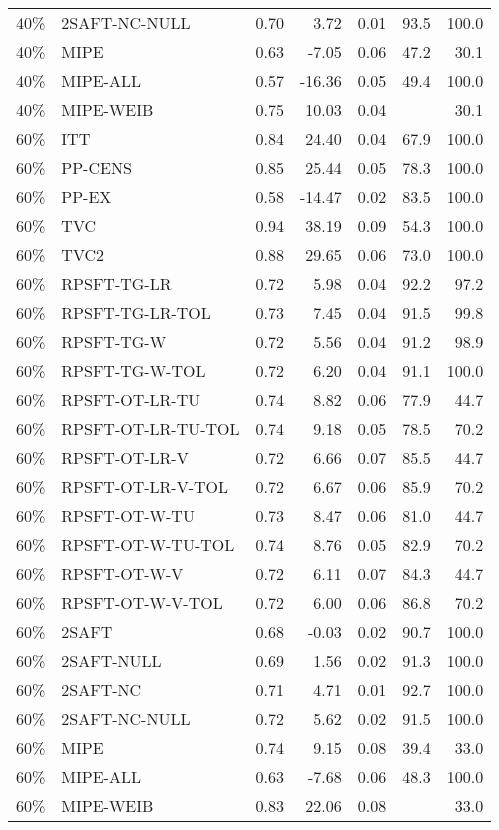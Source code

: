 \begin{table}[ht]
{\begin{tabular}{llrrrrr}
  40\% & 2SAFT-NC-NULL & 0.70 & 3.72 & 0.01 & 93.5 & 100.0 \\ 
  40\% & MIPE & 0.63 & -7.05 & 0.06 & 47.2 & 30.1 \\ 
  40\% & MIPE-ALL & 0.57 & -16.36 & 0.05 & 49.4 & 100.0 \\ 
  40\% & MIPE-WEIB & 0.75 & 10.03 & 0.04 &  & 30.1 \\ 
   \hline
60\% & ITT & 0.84 & 24.40 & 0.04 & 67.9 & 100.0 \\ 
  60\% & PP-CENS & 0.85 & 25.44 & 0.05 & 78.3 & 100.0 \\ 
  60\% & PP-EX & 0.58 & -14.47 & 0.02 & 83.5 & 100.0 \\ 
  60\% & TVC & 0.94 & 38.19 & 0.09 & 54.3 & 100.0 \\ 
  60\% & TVC2 & 0.88 & 29.65 & 0.06 & 73.0 & 100.0 \\ 
   \hline
60\% & RPSFT-TG-LR & 0.72 & 5.98 & 0.04 & 92.2 & 97.2 \\ 
  60\% & RPSFT-TG-LR-TOL & 0.73 & 7.45 & 0.04 & 91.5 & 99.8 \\ 
  60\% & RPSFT-TG-W & 0.72 & 5.56 & 0.04 & 91.2 & 98.9 \\ 
  60\% & RPSFT-TG-W-TOL & 0.72 & 6.20 & 0.04 & 91.1 & 100.0 \\ 
  60\% & RPSFT-OT-LR-TU & 0.74 & 8.82 & 0.06 & 77.9 & 44.7 \\ 
  60\% & RPSFT-OT-LR-TU-TOL & 0.74 & 9.18 & 0.05 & 78.5 & 70.2 \\ 
  60\% & RPSFT-OT-LR-V & 0.72 & 6.66 & 0.07 & 85.5 & 44.7 \\ 
  60\% & RPSFT-OT-LR-V-TOL & 0.72 & 6.67 & 0.06 & 85.9 & 70.2 \\ 
   \hline
60\% & RPSFT-OT-W-TU & 0.73 & 8.47 & 0.06 & 81.0 & 44.7 \\ 
  60\% & RPSFT-OT-W-TU-TOL & 0.74 & 8.76 & 0.05 & 82.9 & 70.2 \\ 
  60\% & RPSFT-OT-W-V & 0.72 & 6.11 & 0.07 & 84.3 & 44.7 \\ 
  60\% & RPSFT-OT-W-V-TOL & 0.72 & 6.00 & 0.06 & 86.8 & 70.2 \\ 
   \hline
60\% & 2SAFT & 0.68 & -0.03 & 0.02 & 90.7 & 100.0 \\ 
  60\% & 2SAFT-NULL & 0.69 & 1.56 & 0.02 & 91.3 & 100.0 \\ 
  60\% & 2SAFT-NC & 0.71 & 4.71 & 0.01 & 92.7 & 100.0 \\ 
  60\% & 2SAFT-NC-NULL & 0.72 & 5.62 & 0.02 & 91.5 & 100.0 \\ 
  60\% & MIPE & 0.74 & 9.15 & 0.08 & 39.4 & 33.0 \\ 
  60\% & MIPE-ALL & 0.63 & -7.68 & 0.06 & 48.3 & 100.0 \\ 
  60\% & MIPE-WEIB & 0.83 & 22.06 & 0.08 &  & 33.0 \\ 
   \hline
\end{tabular}
}
\end{table}
